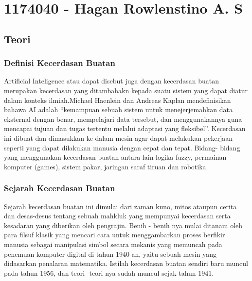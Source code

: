 \section{1174040 - Hagan Rowlenstino A. S}
    \subsection{Teori}
        \subsubsection{Definisi Kecerdasan Buatan}

        Artificial Inteligence atau dapat disebut juga dengan kecerdasan buatan merupakan kecerdasan yang ditambahakn kepada suatu sistem yang dapat diatur dalam konteks ilmiah.Michael Haenlein dan Andreas Kaplan mendefinisikan bahawa AI adalah “kemampuan sebuah sistem untuk menejerjemahkan data eksternal dengan benar, mempelajari data tersebut, dan menggunakannya guna mencapai tujuan dan tugas tertentu melalui adaptasi yang fleksibel”. Kecerdasan ini dibuat dan dimasukkan ke dalam mesin agar dapat melakukan pekerjaan seperti yang dapat dilakukan manusia dengan cepat dan tepat. Bidang- bidang yang menggunakan kecerdasan buatan antara lain logika fuzzy, permainan komputer (games), sistem pakar, jaringan saraf tiruan dan robotika.
        
        \subsubsection{Sejarah Kecerdasan Buatan}
        
        Sejarah kecerdasan buatan ini dimulai dari zaman kuno, mitos ataupun cerita dan desas-desus tentang sebuah mahkluk yang mempunyai kecerdasan serta kesadaran yang diberikan oleh pengrajin. Benih - benih nya mulai ditanam oleh para filsuf klasik yang mencari cara untuk menggambarkan proses berfikir manusia sebagai manipulasi simbol secara mekanis yang memuncah pada penemuan komputer digital di tahun 1940-an, yaitu sebuah mesin yang didasarkan penalaran matematika. Istilah kecerdasan buatan sendiri baru muncul pada tahun 1956, dan teori -teori nya sudah muncul sejak tahun 1941.


